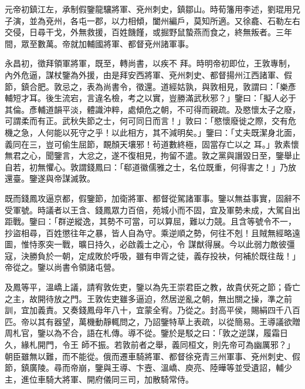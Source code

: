 \begin{pinyinscope}
 元帝初鎮江左，承制假鑒龍驤將軍、兗州刺史，鎮鄒山。時荀籓用李述，劉琨用兄子演，並為兗州，各屯一郡，以力相傾，闔州編戶，莫知所適。又徐龕、石勒左右交侵，日尋干戈，外無救援，百姓饑饉，或掘野鼠蟄燕而食之，終無叛者。三年間，眾至數萬。帝就加輔國將軍、都督兗州諸軍事。



 永昌初，徵拜領軍將軍，既至，轉尚書，以疾不
 拜。時明帝初即位，王敦專制，內外危逼，謀杖鑒為外援，由是拜安西將軍、兗州刺史、都督揚州江西諸軍、假節，鎮合肥。敦忌之，表為尚書令，徵還。道經姑孰，與敦相見，敦謂曰：「樂彥輔短才耳。後生流宕，言違名檢，考之以實，豈勝滿武秋邪？」鑒曰：「擬人必于其倫。彥輔道韻平淡，體識沖粹，處傾危之朝，不可得而親疏。及愍懷太子之廢，可謂柔而有正。武秋失節之士，何可同日而言！」敦曰：「愍懷廢徙之際，交有危機之急，人何能以死守之乎！以此相方，其不減明矣。」鑒曰：「丈夫既潔身北面，義同在三，豈可偷生屈節，靦顏天壤邪！茍道數終極，固當存亡以之
 耳。」敦素懷無君之心，聞鑒言，大忿之，遂不復相見，拘留不遣。敦之黨與譖毀日至，鑒舉止自若，初無懼心。敦謂錢鳳曰：「郗道徽儒雅之士，名位既重，何得害之！」乃放還臺。鑒遂與帝謀滅敦。



 既而錢鳳攻逼京都，假鑒節，加衛將軍、都督從駕諸軍事。鑒以無益事實，固辭不受軍號。時議者以王含、錢鳳眾力百倍，苑城小而不固，宜及軍勢未成，大駕自出距戰。鑒曰：「群逆縱逸，其勢不可當，可以算屈，難以力競。且含等號令不一，抄盜相尋，百姓懲往年之暴，皆人自為守。乘逆順之勢，何往不剋！且賊無經略遠圖，惟恃豕突一戰，曠日持久，必啟義士之心，令
 謀猷得展。今以此弱力敵彼彊寇，決勝負於一朝，定成敗於呼吸，雖有申胥之徒，義存投袂，何補於既往哉！」帝從之。鑒以尚書令領諸屯營。



 及鳳等平，溫嶠上議，請宥敦佐吏，鑒以為先王崇君臣之教，故貴伏死之節；昏亡之主，故開待放之門。王敦佐吏雖多逼迫，然居逆亂之朝，無出關之操，準之前訓，宜加義責。又奏錢鳳母年八十，宜蒙全宥。乃從之。封高平侯，賜絹四千八百匹。帝以其有器望，萬機動靜輒問之，乃詔鑒特草上表疏，以從簡易。王導議欲贈周札官，鑒以為不合，語在札傳。導不從。鑒於是駁之曰：「敦之逆謀，履霜日久，緣札開門，令王
 師不振。若敦前者之舉，義同桓文，則先帝可為幽厲邪？」朝臣雖無以難，而不能從。俄而遷車騎將軍、都督徐兗青三州軍事、兗州刺史、假節，鎮廣陵。尋而帝崩，鑒與王導、卞壼、溫嶠、庾亮、陸曄等並受遺詔，輔少主，進位車騎大將軍、開府儀同三司，加散騎常侍。




\end{pinyinscope}
